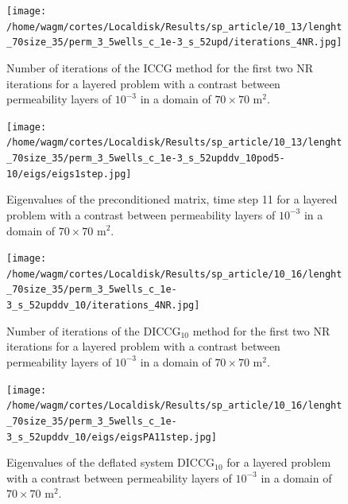 \documentclass[12pt]{article}
\begin{document}
\begin{figure}[!h]
\centering
\begin{minipage}{.4\textwidth}
\vspace{-0.9cm}
\hspace{-1cm}
\texttt{[image: /home/wagm/cortes/Localdisk/Results/sp\_article/10\_13/lenght\_70size\_35/perm\_3\_5wells\_c\_1e-3\_s\_52upd/iterations\_4NR.jpg]}
\vspace{-1.3cm}
\caption{Number of iterations of the ICCG method for the first two NR iterations for a layered problem with a contrast between permeability layers of $10^{-3}$ in a domain of $70 \times 70$ m$^2$.}
\label{fig:NR_IC_3}
\end{minipage}%
\hspace{15mm}
\begin{minipage}{.4\textwidth}
 \centering
 \vspace{-5mm}
\texttt{[image: /home/wagm/cortes/Localdisk/Results/sp\_article/10\_13/lenght\_70size\_35/perm\_3\_5wells\_c\_1e-3\_s\_52upddv\_10pod5-10/eigs/eigs1step.jpg]}
\caption{Eigenvalues of the preconditioned matrix, time step 11 for a layered problem with a contrast between permeability layers of $10^{-3}$ in a domain of $70 \times 70$ m$^2$.}
\label{fig:eigs_MA_3}
\end{minipage}
\end{figure}


\begin{figure}[!h]
\centering
\begin{minipage}{.4\textwidth}
\vspace{-0.4cm}
\hspace{-1cm}
\texttt{[image: /home/wagm/cortes/Localdisk/Results/sp\_article/10\_16/lenght\_70size\_35/perm\_3\_5wells\_c\_1e-3\_s\_52upddv\_10/iterations\_4NR.jpg]}
\vspace{-1.3cm}
\caption{Number of iterations of the DICCG$_{10}$ method for the first two NR iterations for a layered problem with a contrast between permeability layers of $10^{-3}$ in a domain of $70 \times 70$ m$^2$.}
\label{fig:NR_D10_3}
\end{minipage}%
\hspace{15mm}
\begin{minipage}{.4\textwidth}
 \centering
\texttt{[image: /home/wagm/cortes/Localdisk/Results/sp\_article/10\_16/lenght\_70size\_35/perm\_3\_5wells\_c\_1e-3\_s\_52upddv\_10/eigs/eigsPA11step.jpg]}
\caption{Eigenvalues of the deflated system DICCG$_{10}$ for a layered problem with a contrast between permeability layers of $10^{-3}$ in a domain of $70 \times 70$ m$^2$.}
\label{fig:eigs_PA10_3}
\end{minipage}
\end{figure}
\end{document}
